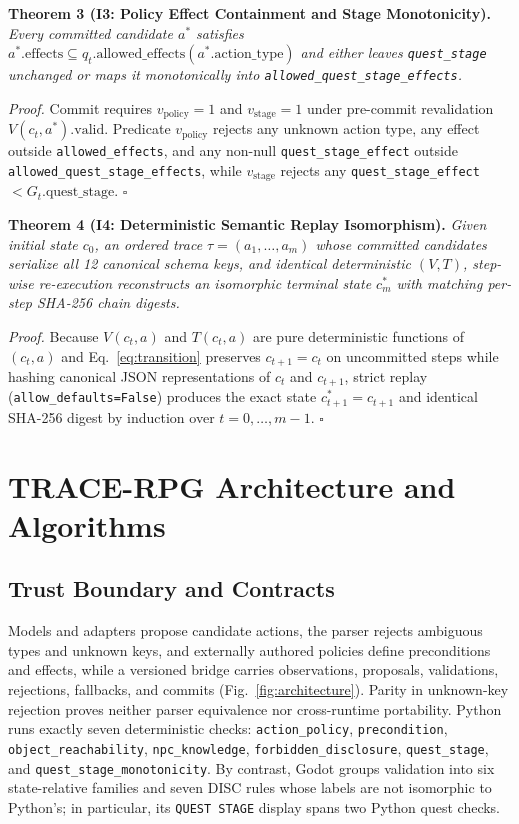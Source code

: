 \documentclass[journal]{IEEEtran}
\begin{document}
\noindent\textbf{Theorem 3 (I3: Policy Effect Containment and Stage Monotonicity).} \emph{Every committed candidate $a^*$ satisfies $a^*.\mathrm{effects}\subseteq q_t.\mathrm{allowed\_effects}(a^*.\mathrm{action\_type})$ and either leaves \texttt{quest\_stage} unchanged or maps it monotonically into \texttt{allowed\_quest\_stage\_effects}.}
\par\noindent\textit{Proof.} Commit requires $v_{\mathrm{policy}}=1$ and $v_{\mathrm{stage}}=1$ under pre-commit revalidation $V(c_t,a^*).\mathrm{valid}$. Predicate $v_{\mathrm{policy}}$ rejects any unknown action type, any effect outside \texttt{allowed\_effects}, and any non-null \texttt{quest\_stage\_effect} outside \texttt{allowed\_quest\_stage\_effects}, while $v_{\mathrm{stage}}$ rejects any \texttt{quest\_stage\_effect} $< G_t.\mathrm{quest\_stage}$. \hfill$\square$

\noindent\textbf{Theorem 4 (I4: Deterministic Semantic Replay Isomorphism).} \emph{Given initial state $c_0$, an ordered trace $\tau=(a_1,\dots,a_m)$ whose committed candidates serialize all 12 canonical schema keys, and identical deterministic $(V,T)$, step-wise re-execution reconstructs an isomorphic terminal state $c_m^*$ with matching per-step SHA-256 chain digests.}
\par\noindent\textit{Proof.} Because $V(c_t,a)$ and $T(c_t,a)$ are pure deterministic functions of $(c_t,a)$ and Eq.~\ref{eq:transition} preserves $c_{t+1}=c_t$ on uncommitted steps while hashing canonical JSON representations of $c_t$ and $c_{t+1}$, strict replay (\texttt{allow\_defaults=False}) produces the exact state $c_{t+1}^*=c_{t+1}$ and identical SHA-256 digest by induction over $t=0,\dots,m{-}1$. \hfill$\square$

\section{TRACE-RPG Architecture and Algorithms}\label{sec:arch}
\subsection{Trust Boundary and Contracts}
Models and adapters propose candidate actions, the parser rejects ambiguous types and unknown keys, and externally authored policies define preconditions and effects, while a versioned bridge carries observations, proposals, validations, rejections, fallbacks, and commits (Fig.~\ref{fig:architecture}). Parity in unknown-key rejection proves neither parser equivalence nor cross-runtime portability. Python runs exactly seven deterministic checks: \texttt{action\_policy}, \texttt{precondition}, \texttt{object\_reachability}, \texttt{npc\_knowledge}, \texttt{forbidden\_disclosure}, \texttt{quest\_stage}, and \texttt{quest\_stage\_monotonicity}. By contrast, Godot groups validation into six state-relative families and seven DISC rules whose labels are not isomorphic to Python's; in particular, its \texttt{QUEST STAGE} display spans two Python quest checks.
\end{document}
